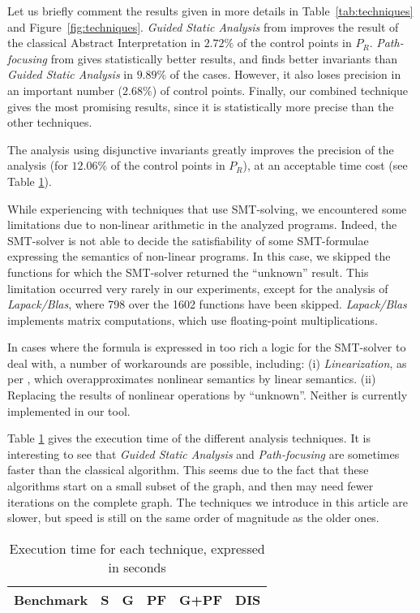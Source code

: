 \documentclass{entcs}
\begin{document}
Let us briefly comment the results given in more details in Table~\ref{tab:techniques} and Figure~\ref{fig:techniques}.
\emph{Guided Static Analysis} from \citet{DBLP:conf/sas/GopanR07} improves the
result of the classical Abstract Interpretation in $2.72\%$ of the control points
in $P_R$.
\emph{Path-focusing} from \citet{Monniaux_Gonnord_SAS11} gives
statistically better results, and finds better invariants than \emph{Guided
Static Analysis} in $9.89\%$ of the cases. However, it also loses precision in an
important number ($2.68\%$) of control points.
Finally, our combined technique gives the most promising results, since it is
statistically more precise than the other techniques.

The analysis using disjunctive invariants greatly improves the
precision of the analysis (for $12.06\%$ of the control points in $P_R$), at an
acceptable time cost (see Table \ref{tab:time}).

While experiencing with techniques that use SMT-solving, we encountered some
limitations due to non-linear arithmetic in the analyzed programs. Indeed, 
the SMT-solver is not able to decide the satisfiability of some SMT-formulae
expressing the semantics of non-linear programs. 
In this case, we skipped the functions for which the SMT-solver returned the
``unknown'' result.
This limitation occurred very rarely in our experiments, except for the analysis
of \emph{Lapack/Blas}, where 798 over the 1602 functions have been skipped.
\emph{Lapack/Blas} implements matrix computations, which use floating-point multiplications.

In cases where the formula is expressed in too rich a logic for the SMT-solver to deal with, a number of workarounds are possible, including:
(i) \emph{Linearization}, as per \citet{DBLP:conf/vmcai/Mine06}, which overapproximates nonlinear semantics by linear semantics.
(ii) Replacing the results of nonlinear operations by ``unknown''.
Neither is currently implemented in our tool.

Table \ref{tab:time} gives the execution time of the different analysis
techniques. It is interesting to see that \emph{Guided Static Analysis} and
\emph{Path-focusing} are sometimes faster than the classical
algorithm.
This seems due to the fact that these algorithms start on a small subset
of the graph, and then may need fewer iterations on the complete graph.
The techniques we introduce in this article are slower, but speed is still on the same order of magnitude as the older ones.

\begin{table}[!h]
	\centering \tiny
\begin{tabular}{|l|r|r|r|r|r|} \hline
	\multicolumn{1}{|c|}{Benchmark} &
        \multicolumn{1}{c|}{\textbf{S}} &
        \multicolumn{1}{c|}{\textbf{G}} &
        \multicolumn{1}{c|}{\textbf{PF}} &
        \multicolumn{1}{c|}{\textbf{G+PF}} &
	\multicolumn{1}{c|}{\textbf{DIS}} \\ \hline
	 \hline
\end{tabular}
\caption{Execution time for each technique, expressed in seconds}
\label{tab:time}
\end{table}
\end{document}
